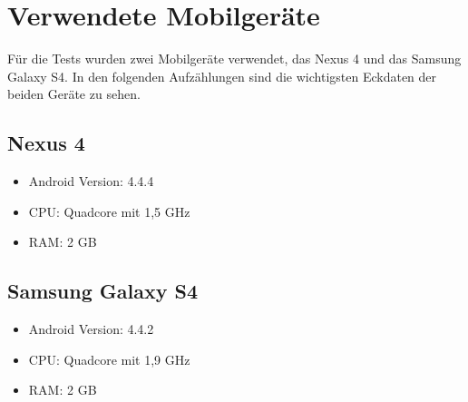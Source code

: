 \section{Verwendete Mobilgeräte}
Für die Tests wurden zwei Mobilgeräte verwendet, das Nexus 4 und das Samsung Galaxy S4. In den folgenden Aufzählungen sind die wichtigsten Eckdaten der beiden Geräte zu sehen.

\subsection{Nexus 4 \cite{48}}
\begin{itemize}
  \item Android Version: 4.4.4
  \item CPU: Quadcore mit 1,5 GHz
  \item RAM: 2 GB
\end{itemize}

\subsection{Samsung Galaxy S4 \cite{49}}
\begin{itemize}
  \item Android Version: 4.4.2
  \item CPU: Quadcore mit 1,9 GHz
  \item RAM: 2 GB
\end{itemize}

